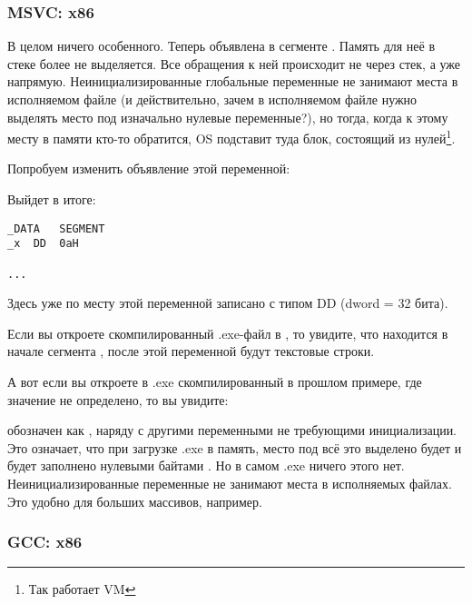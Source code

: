 \subsubsection{MSVC: x86}



В целом ничего особенного. Теперь  объявлена в сегменте . 
Память для неё в стеке более не выделяется.
Все обращения к ней происходит не через стек, а уже напрямую. 
Неинициализированные глобальные переменные не занимают места в исполняемом файле
(и действительно, зачем в исполняемом файле
нужно выделять место под изначально нулевые переменные?), но тогда, когда к этому месту в памяти
кто-то обратится, \ac{OS} подставит туда блок, состоящий из нулей\footnote{Так работает \ac{VM}}.

Попробуем изменить объявление этой переменной:



Выйдет в итоге:

\begin{lstlisting}
_DATA	SEGMENT
_x	DD	0aH

...
\end{lstlisting}

Здесь уже по месту этой переменной записано  с типом DD (dword = 32 бита).

Если вы откроете скомпилированный .exe-файл в \IDA, то увидите, что  
находится в начале сегмента , после этой переменной будут текстовые строки.

А вот если вы откроете в \IDA .exe скомпилированный в прошлом примере, где значение  не определено, то вы увидите:



 обозначен как , наряду с другими переменными не требующими инициализации. 
Это означает, что при загрузке .exe в память, место под всё это выделено будет и будет заполнено
нулевыми байтами .
Но в самом .exe ничего этого нет. Неинициализированные переменные не занимают места в исполняемых файлах. 
Это удобно для больших массивов, например.



\subsubsection{GCC: x86}

